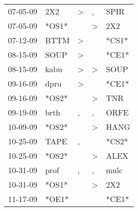 \begin{supertabular}{p{0.07\textwidth}p{0.06\textwidth}p{0.02\textwidth}p{0.02\textwidth}p{0.06\textwidth}}
          07-05-09\textsuperscript{} &            2X2\textsuperscript{} &     \textgreater &                , &           SPIR\textsuperscript{} \\
          07-05-09\textsuperscript{} &                            *OS1* &                  &     \textgreater &            2X2\textsuperscript{} \\
          07-12-09\textsuperscript{} &           BTTM\textsuperscript{} &     \textgreater &                  &                            *CS1* \\
          08-15-09\textsuperscript{} &           SOUP\textsuperscript{} &     \textgreater &                  &                            *CE1* \\
          08-15-09\textsuperscript{} &           kabu\textsuperscript{} &     \textgreater &     \textgreater &           SOUP\textsuperscript{} \\
          09-16-09\textsuperscript{} &           dpru\textsuperscript{} &     \textgreater &                  &                            *CE1* \\
          09-16-09\textsuperscript{} &                            *OS2* &                  &     \textgreater &            TNR\textsuperscript{} \\
          09-19-09\textsuperscript{} &           brth\textsuperscript{} &                , &                , &           ORFE\textsuperscript{} \\
          10-09-09\textsuperscript{} &                            *OS2* &                  &     \textgreater &           HANG\textsuperscript{} \\
          10-25-09\textsuperscript{} &           TAPE\textsuperscript{} &                , &                  &                            *CS2* \\
          10-25-09\textsuperscript{} &                            *OS2* &                  &     \textgreater &           ALEX\textsuperscript{} \\
          10-31-09\textsuperscript{} &           prof\textsuperscript{} &                , &                , &           mulc\textsuperscript{} \\
          10-31-09\textsuperscript{} &                            *OS1* &                  &     \textgreater &            2X2\textsuperscript{} \\
          11-17-09\textsuperscript{} &                            *OE1* &                  &                  &                            *CE1* \\

\end{supertabular}
